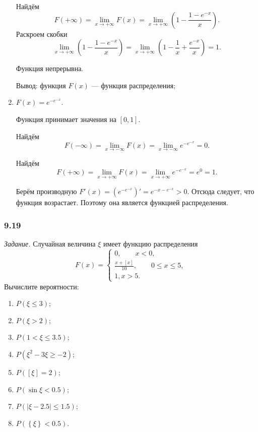 \begin{enumerate}[label=\alph*)]
Найдём
$$F \left( + \infty \right) =
\lim \limits_{x \to + \infty } F \left( x \right) =
\lim \limits_{x \to + \infty } \left( 1 - \frac{1-e^{-x}}{x} \right).$$
Раскроем скобки
$$\lim \limits_{x \to + \infty } \left( 1 - \frac{1-e^{-x}}{x} \right) =
\lim \limits_{x \to + \infty } \left( 1 - \frac{1}{x} + \frac{e^{-x}}{x} \right) =
1.$$

Функция непрерывна.

Вывод: функция $F \left( x \right) $ --- функция распределения;
\item $F \left( x \right) = e^{-e^{-x}}$.

Функция принимает значения на $ \left[ 0, 1 \right] $.

Найдём
$$F \left( - \infty \right) =
\lim \limits_{x \to - \infty } F \left( x \right) =
\lim \limits_{x \to - \infty } e^{-e^{-x}} =
0.$$

Найдём
$$F \left( + \infty \right) =
\lim \limits_{x \to + \infty } F \left( x \right) =
\lim \limits_{x \to + \infty } e^{-e^{-x}} =
e^0 =
1.$$

Берём производную $F' \left( x \right) = \left( e^{-e^{-x}} \right)' = e^{-x-e^{-x}} > 0$.
Отсюда следует, что функция возрастает.
Поэтому она является функцией распределения.
\end{enumerate}

\subsubsection*{9.19}

\textit{Задание.} Случайная величина $ \xi $ имеет функцию распределения
$$F \left( x \right) =
\begin{cases}
0, \qquad x < 0, \\
\frac{x + \left[ x \right] }{10}, \qquad 0 \leq x \leq 5, \\
1, x > 5.
\end{cases}$$
Вычислите вероятности:
\begin{enumerate}[label=\alph*)]
\item $P \left( \xi \leq 3 \right) $;
\item $P \left( \xi > 2 \right) $;
\item $P \left( 1 < \xi \leq 3.5 \right) $;
\item $P \left( \xi^2 - 3 \xi \geq -2 \right) $;
\item $P \left( \left[ \xi \right] = 2 \right) $;
\item $P \left( \sin \xi < 0.5 \right) $;
\item $P \left( \left| \xi - 2.5 \right| \leq 1.5 \right) $;
\item $P \left( \left\{ \xi \right\} < 0.5 \right) $.
\end{enumerate}


